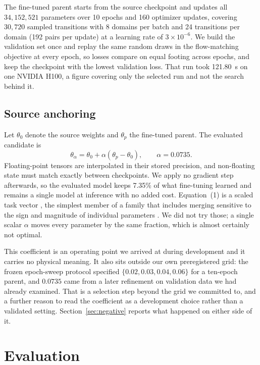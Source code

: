 \documentclass{article}
\begin{document}
The fine-tuned parent starts from the source checkpoint and updates all $34{,}152{,}521$ parameters over 10 epochs and 160 optimizer updates, covering $30{,}720$ sampled transitions with 8 domains per batch and 24 transitions per domain (192 pairs per update) at a learning rate of $3\times10^{-6}$. We build the validation set once and replay the same random draws in the flow-matching objective at every epoch, so losses compare on equal footing across epochs, and keep the checkpoint with the lowest validation loss. That run took 121.80~s on one NVIDIA H100, a figure covering only the selected run and not the search behind it.

\subsection{Source anchoring}

Let $\theta_0$ denote the source weights and $\theta_p$ the fine-tuned parent. The evaluated candidate is
\begin{equation}
\theta_\alpha = \theta_0 + \alpha(\theta_p - \theta_0), \qquad \alpha = 0.0735.
\end{equation}
Floating-point tensors are interpolated in their stored precision, and non-floating state must match exactly between checkpoints. We apply no gradient step afterwards, so the evaluated model keeps 7.35\% of what fine-tuning learned and remains a single model at inference with no added cost. Equation~(1) is a scaled task vector \citep{ilharco2023task}, the simplest member of a family that includes merging sensitive to the sign and magnitude of individual parameters \citep{yadav2023ties}. We did not try those; a single scalar $\alpha$ moves every parameter by the same fraction, which is almost certainly not optimal.

This coefficient is an operating point we arrived at during development and it carries no physical meaning. It also sits outside our own preregistered grid: the frozen epoch-sweep protocol specified $\{0.02, 0.03, 0.04, 0.06\}$ for a ten-epoch parent, and $0.0735$ came from a later refinement on validation data we had already examined. That is a selection step beyond the grid we committed to, and a further reason to read the coefficient as a development choice rather than a validated setting. Section~\ref{sec:negative} reports what happened on either side of it.

\section{Evaluation}
\end{document}
